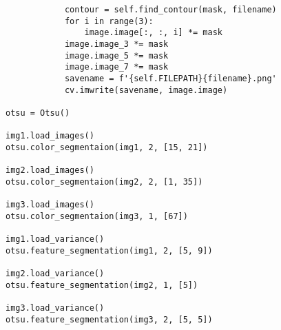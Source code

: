 \documentclass[11pt]{article}
\begin{document}
\begin{lstlisting}
            contour = self.find_contour(mask, filename)
            for i in range(3):
                image.image[:, :, i] *= mask
            image.image_3 *= mask
            image.image_5 *= mask
            image.image_7 *= mask
            savename = f'{self.FILEPATH}{filename}.png'
            cv.imwrite(savename, image.image)

otsu = Otsu()

img1.load_images()
otsu.color_segmentaion(img1, 2, [15, 21])

img2.load_images()
otsu.color_segmentaion(img2, 2, [1, 35])

img3.load_images()
otsu.color_segmentaion(img3, 1, [67])

img1.load_variance()
otsu.feature_segmentation(img1, 2, [5, 9])

img2.load_variance()
otsu.feature_segmentation(img2, 1, [5])

img3.load_variance()
otsu.feature_segmentation(img3, 2, [5, 5])

\end{lstlisting}

\end{document}
